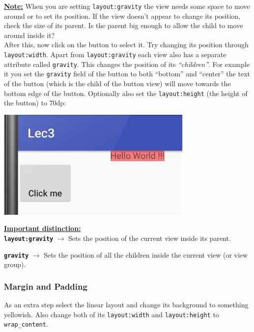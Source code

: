 \underline{\textbf{Note:}} When you are setting \texttt{layout:gravity} the view needs some space to move around or to set its position. If the view doesn't appear to change its position, check the size of its parent. Is the parent big enough to allow the child to move around inside it? \\

After this, now click on the button to select it. Try changing its position through \texttt{layout:width}. Apart from \texttt{layout:gravity} each view also has a separate attribute called \texttt{gravity}. This changes the position of its \textit{``children''}. For example it you set the \texttt{gravity} field of the button to both ``bottom'' and ``center'' the text of the button (which is the child of the button view) will move towards the bottom edge of the button. Optionally also set the \texttt{layout:height} (the height of the button) to 70dp:

\begin{center}
	\includegraphics[scale=0.4]{chapters/ch03/images/12_gravity}
\end{center} 

\underline{\textbf{Important distinction:}}\\

\textbf{\texttt{layout:gravity}} $\rightarrow$ Sets the position of the current view inside its parent.

\textbf{\texttt{gravity}} $\rightarrow$ Sets the position of all the children inside the current view (or view group). \\

\subsubsection{Margin and Padding}
As an extra step select the linear layout and change its background to something yellowish. Also change both of its \texttt{layout:width} and \texttt{layout:height} to \texttt{wrap\_content}. \\

